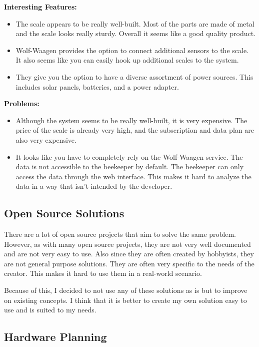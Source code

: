 \newpage
\textbf{Interesting Features:}
\begin{itemize}
    \item The scale appears to be really well-built. Most of the parts are made of metal and the scale looks really sturdy. Overall it seems like a good quality product. 
    \item Wolf-Waagen provides the option to connect additional sensors to the scale. It also seems like you can easily hook up additional scales to the system.
    \item They give you the option to have a diverse assortment of power sources. This includes solar panels, batteries, and a power adapter.
\end{itemize}
\textbf{Problems:}
\begin{itemize}
    \item Although the system seems to be really well-built, it is very expensive. The price of the scale is already very high, and the subscription and data plan are also very expensive.
    \item It looks like you have to completely rely on the Wolf-Waagen service. The data is not accessible to the beekeeper by default. The beekeeper can only access the data through the web interface. This makes it hard to analyze the data in a way that isn't intended by the developer.
\end{itemize}

\newpage

\subsection{Open Source Solutions}

There are a lot of open source projects that aim to solve the same problem. However, as with many open source projects, they are not very well documented and are not very easy to use. Also since they are often created by hobbyists, they are not general purpose solutions. They are often very specific to the needs of the creator. This makes it hard to use them in a real-world scenario.

Because of this, I decided to not use any of these solutions as is but to improve on existing concepts. I think that it is better to create my own solution easy to use and is suited to my needs.

\newpage

\subsection{Hardware Planning}
